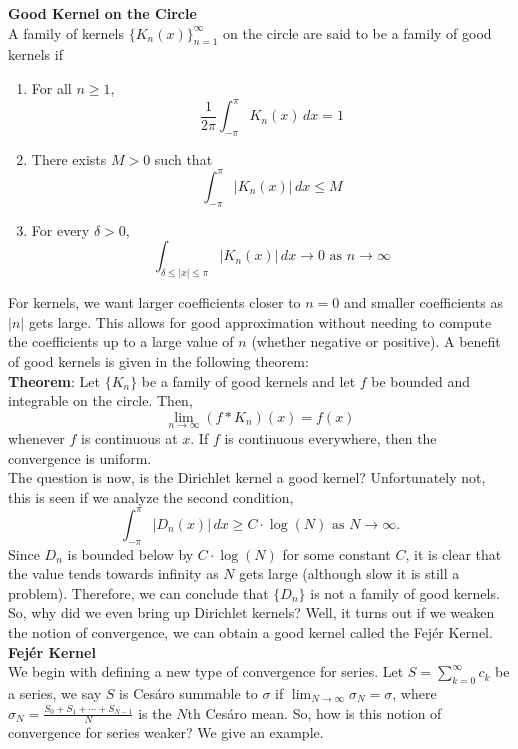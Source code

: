 \documentclass[12pt]{article}
\begin{document}
\noindent \textbf{Good Kernel on the Circle} \\
\noindent A family of kernels $\{K_n(x)\}^\infty_{n=1}$ on the circle are said to be a family of good kernels if
\begin{enumerate}[itemsep=0pt, topsep=0pt, parsep=0pt, partopsep=0pt] 
\item For all $n\geq 1$,
$$\frac{1}{2\pi} \int^{\pi}_{-\pi} K_n(x) \, dx = 1$$
\item There exists $M>0$ such that 
$$\int^\pi_{-\pi} \vert K_n(x) \vert \, dx \leq M$$
\item For every $\delta>0$,
$$\int_{\delta \leq \vert x \vert \leq \pi} \vert K_n(x) \vert \, dx \rightarrow 0 \text{ as } n \rightarrow \infty$$
\end{enumerate}
\noindent For kernels, we want larger coefficients closer to $n=0$ and smaller coefficients as $\vert n \vert$ gets large. This allows for good approximation without needing to compute the coefficients up to a large value of $n$ (whether negative or positive). A benefit of good kernels is given in the following theorem: \\

\noindent \textbf{Theorem}: Let $\{K_n\}$ be a family of good kernels and let $f$ be bounded and integrable on the circle. Then,
$$ \lim_{n\rightarrow \infty} (f * K_n)(x)=f(x)$$
whenever $f$ is continuous at $x$. If $f$ is continuous everywhere, then the convergence is uniform. \\

\noindent The question is now, is the Dirichlet kernel a good kernel? Unfortunately not, this is seen if we analyze the second condition,
$$\int^\pi_{-\pi} \vert D_n(x) \vert \, dx \geq C \cdot \log(N) \text{ as } N \rightarrow \infty.$$
\noindent Since $D_n$ is bounded below by $C \cdot \log(N)$ for some constant $C$, it is clear that the value tends towards infinity as $N$ gets large (although slow it is still a problem). Therefore, we can conclude that $\{D_n\}$ is not a family of good kernels. So, why did we even bring up Dirichlet kernels? Well, it turns out if we weaken the notion of convergence, we can obtain a good kernel called the Fej\'er Kernel. \\

\noindent \textbf{Fej\'er Kernel} \\
\noindent We begin with defining a new type of convergence for series. Let $S=\sum^\infty_{k=0} c_k$ be a series, we say $S$ is Ces\'aro summable to $\sigma$ if $\lim_{N\rightarrow \infty} \sigma_N = \sigma$, where $\sigma_N = \frac{S_0 + S_1 + \cdots + S_{N-1}}{N}$ is the $N$th Ces\'aro mean. So, how is this notion of convergence for series weaker? We give an example. \\
\end{document}

